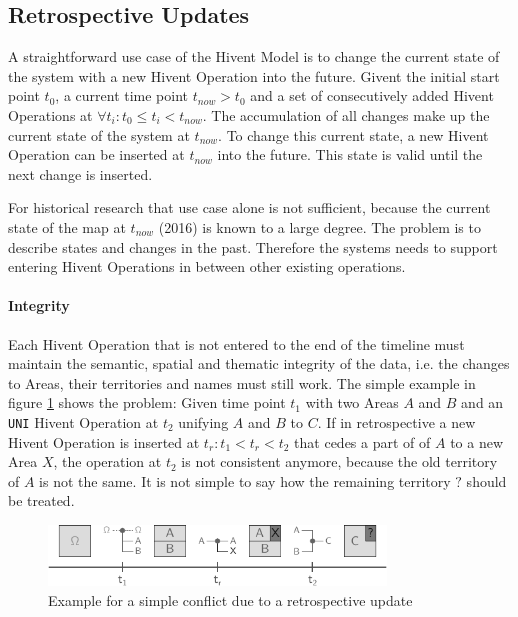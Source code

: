 
\subsection{Retrospective Updates} %
\label{sub:retrospective_updates}

A straightforward use case of the Hivent Model is to change the current state of the system with a new Hivent Operation into the future. Givent the initial start point $t_0$, a current time point $t_{now} > t_0$ and a set of consecutively added Hivent Operations at $\forall t_i: t_0 \leq t_i < t_{now}$. The accumulation of all changes make up the current state of the system at $t_{now}$. To change this current state, a new Hivent Operation can be inserted at $t_{now}$ into the future. This state is valid until the next change is inserted.

For historical research that use case alone is not sufficient, because the current state of the map at $t_{now}$ (2016) is known to a large degree. The problem is to describe states and changes in the past. Therefore the systems needs to support entering Hivent Operations in between other existing operations.


\paragraph{Integrity} %
\label{par:integrity}

Each Hivent Operation that is not entered to the end of the timeline must maintain the semantic, spatial and thematic integrity of the data, i.e. the changes to Areas, their territories and names must still work. The simple example in figure \ref{fig:update_conflict_example} shows the problem: Given time point $t_1$ with two Areas $A$ and $B$ and an \texttt{UNI} Hivent Operation at $t_2$ unifying $A$ and $B$ to $C$. If in retrospective a new Hivent Operation is inserted at $t_r: t_1 < t_r < t_2$ that cedes a part of of $A$ to a new Area $X$, the operation at $t_2$ is not consistent anymore, because the old territory of $A$ is not the same. It is not simple to say how the remaining territory $?$ should be treated.

\begin{figure}[H]
  \vspace{1em}
  \centering
  \includegraphics[width=0.8\textwidth]{graphics/development/update_conflict/example}
  \caption{Example for a simple conflict due to a retrospective update}
  \label{fig:update_conflict_example}
\end{figure}

